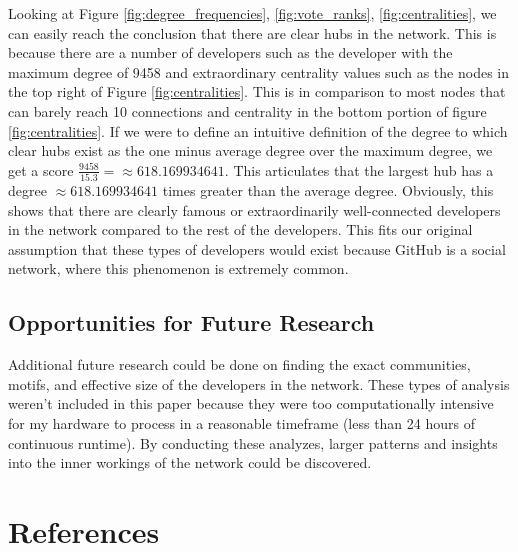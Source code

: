 \documentclass[9pt,twocolumn,twoside]{pnas-new}
\begin{document}
Looking at Figure \ref{fig:degree_frequencies}, \ref{fig:vote_ranks}, \ref{fig:centralities}, we can easily reach the conclusion that there are clear hubs in the network. This is because there are a number of developers such as the developer with the maximum degree of 9458 and extraordinary centrality values such as the nodes in the top right of Figure \ref{fig:centralities}. This is in comparison to most nodes that can barely reach 10 connections and centrality in the bottom portion of figure \ref{fig:centralities}. If we were to define an intuitive definition of the degree to which clear hubs exist as the one minus average degree over the maximum degree, we get a score $\frac{9458}{15.3} = \approx 618.169934641$. This articulates that the largest hub has a degree $\approx 618.169934641$ times greater than the average degree. Obviously, this shows that there are clearly famous or extraordinarily well-connected developers in the network compared to the rest of the developers. This fits our original assumption that these types of developers would exist because GitHub is a social network, where this phenomenon is extremely common.

\subsection{Opportunities for Future Research} Additional future research could be done on finding the exact communities, motifs, and effective size of the developers in the network. These types of analysis weren't included in this paper because they were too computationally intensive for my hardware to process in a reasonable timeframe (less than 24 hours of continuous runtime). By conducting these analyzes, larger patterns and insights into the inner workings of the network could be discovered.


\showacknow{}

\section{References}


\end{document}
